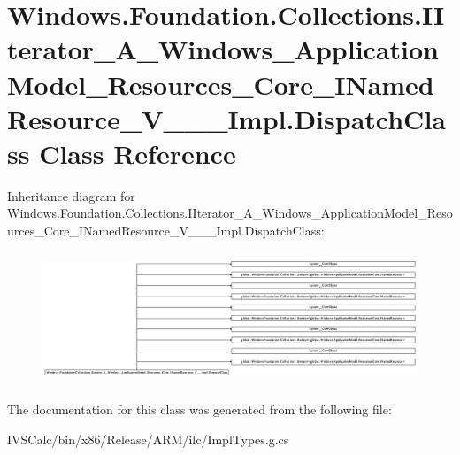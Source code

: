 \hypertarget{class_windows_1_1_foundation_1_1_collections_1_1_i_iterator___a___windows___application_model___97e1cff3cfda907ea87ad59994992909}{}\section{Windows.\+Foundation.\+Collections.\+I\+Iterator\+\_\+\+A\+\_\+\+Windows\+\_\+\+Application\+Model\+\_\+\+Resources\+\_\+\+Core\+\_\+\+I\+Named\+Resource\+\_\+\+V\+\_\+\+\_\+\+\_\+\+Impl.\+Dispatch\+Class Class Reference}
\label{class_windows_1_1_foundation_1_1_collections_1_1_i_iterator___a___windows___application_model___97e1cff3cfda907ea87ad59994992909}
Inheritance diagram for Windows.\+Foundation.\+Collections.\+I\+Iterator\+\_\+\+A\+\_\+\+Windows\+\_\+\+Application\+Model\+\_\+\+Resources\+\_\+\+Core\+\_\+\+I\+Named\+Resource\+\_\+\+V\+\_\+\+\_\+\+\_\+\+Impl.\+Dispatch\+Class\+:\begin{figure}[H]
\begin{center}
\leavevmode
\includegraphics[height=3.969072cm]{class_windows_1_1_foundation_1_1_collections_1_1_i_iterator___a___windows___application_model___97e1cff3cfda907ea87ad59994992909}
\end{center}
\end{figure}


The documentation for this class was generated from the following file\+:\begin{DoxyCompactItemize}
\item 
I\+V\+S\+Calc/bin/x86/\+Release/\+A\+R\+M/ilc/Impl\+Types.\+g.\+cs\end{DoxyCompactItemize}
